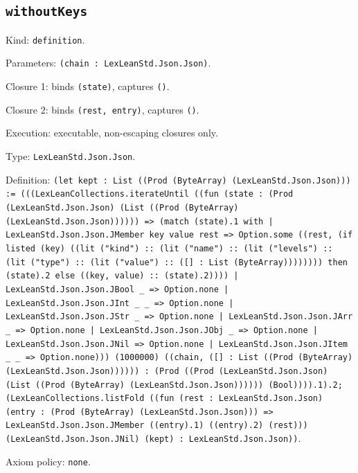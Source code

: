 \documentclass[11pt]{article}
\begin{document}
\subsection*{\texttt{withoutKeys}}
\noindent Kind: \texttt{definition}.\par
\noindent Parameters: \texttt{(chain : LexLeanStd.Json.Json)}.\par
\noindent Closure 1: binds \texttt{(state)}, captures \texttt{()}.\par
\noindent Closure 2: binds \texttt{(rest, entry)}, captures \texttt{()}.\par
\noindent Execution: executable, non-escaping closures only.\par
\noindent Type: \texttt{LexLeanStd.Json.Json}.\par
\noindent Definition: \texttt{(let kept : List ((Prod (ByteArray) (LexLeanStd.Json.Json))) := (((LexLeanCollections.iterateUntil ((fun (state : (Prod (LexLeanStd.Json.Json) (List ((Prod (ByteArray) (LexLeanStd.Json.Json)))))) => (match (state).1 with | LexLeanStd.Json.Json.JMember key value rest => Option.some ((rest, (if listed (key) ((lit ("kind") :: (lit ("name") :: (lit ("levels") :: (lit ("type") :: (lit ("value") :: ([] : List (ByteArray)))))))) then (state).2 else ((key, value) :: (state).2)))) | LexLeanStd.Json.Json.JBool \_ => Option.none | LexLeanStd.Json.Json.JInt \_ \_ => Option.none | LexLeanStd.Json.Json.JStr \_ => Option.none | LexLeanStd.Json.Json.JArr \_ => Option.none | LexLeanStd.Json.Json.JObj \_ => Option.none | LexLeanStd.Json.Json.JNil => Option.none | LexLeanStd.Json.Json.JItem \_ \_ => Option.none))) (1000000) ((chain, ([] : List ((Prod (ByteArray) (LexLeanStd.Json.Json)))))) : (Prod ((Prod (LexLeanStd.Json.Json) (List ((Prod (ByteArray) (LexLeanStd.Json.Json)))))) (Bool)))).1).2; (LexLeanCollections.listFold ((fun (rest : LexLeanStd.Json.Json) (entry : (Prod (ByteArray) (LexLeanStd.Json.Json))) => LexLeanStd.Json.Json.JMember ((entry).1) ((entry).2) (rest))) (LexLeanStd.Json.Json.JNil) (kept) : LexLeanStd.Json.Json))}.\par
\noindent Axiom policy: \texttt{none}.\par
\end{document}

